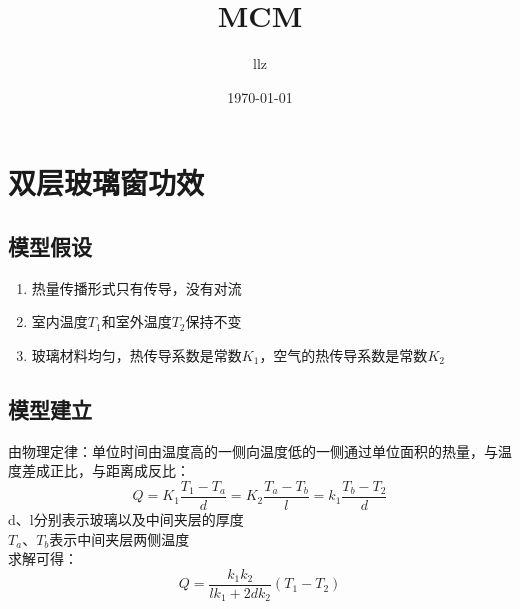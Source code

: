 \documentclass[12pt,a4paper]{article}
\title{MCM}
\author{llz}
\date{\today}
\begin{document}
\kaishu
\maketitle

\section{双层玻璃窗功效}
\subsection{模型假设}
\begin{enumerate}
\item{热量传播形式只有传导，没有对流}
\item{室内温度$T_1$和室外温度$T_2$保持不变}
\item{玻璃材料均匀，热传导系数是常数$K_1$，空气的热传导系数是常数$K_2$}
\end{enumerate} 
\subsection{模型建立}
由物理定律：单位时间由温度高的一侧向温度低的一侧通过单位面积的热量，与温度差成正比，与距离成反比：
\begin{equation}
Q=K_1\frac{T_1-T_a}{d}=K_2\frac{T_a-T_b}{l}=k_1\frac{T_b-T_2}{d}
\end{equation}
d、l分别表示玻璃以及中间夹层的厚度\\
$T_a$、$T_b$表示中间夹层两侧温度\\
求解可得：
\begin{equation}
Q=\frac{k_1k_2}{lk_1+2dk_2}(T_1-T_2)
\end{equation}
\end{document}
